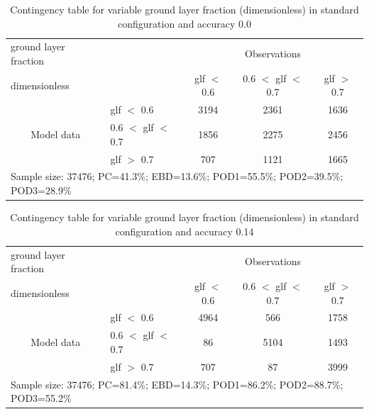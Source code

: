\documentclass[a4paper,english]{article}
\begin{document}
\newpage

\clearpage
\begin{table}[]
\begin{center}
\begin{tabular}{llccc}
\hline
{ground layer fraction}                                       &                                                    & \multicolumn{3}{c}{Observations}                 \\
{dimensionless}                                       &                             & glf $<$ 0.6   & 0.6 $<$ glf $<$ 0.7 & glf $>$ 0.7 \\
\hline
\multicolumn{1}{c}{\multirow{3}{*}{Model data}}  & glf $<$ 0.6             & 3194                & 2361                       & 1636              \\
                                                 & 0.6  $<$ glf $<$ 0.7 & 1856                & 2275                       & 2456              \\
                                                 & glf $>$ 0.7             & 707                & 1121                       & 1665              \\
\hline
\multicolumn{5}{l}{Sample size: 37476; PC=41.3\%; EBD=13.6\%; POD1=55.5\%; POD2=39.5\%; POD3=28.9\%}
\end{tabular}
\end{center}
\caption{Contingency table for variable ground layer fraction (dimensionless) in standard configuration and accuracy 0.0}
\label{tab:contingencyglfBEF}
\end{table}
\begin{table}[]
\begin{center}
\begin{tabular}{llccc}
\hline
{ground layer fraction}                                       &                                                    & \multicolumn{3}{c}{Observations}                 \\
{dimensionless}                                       &                             & glf $<$ 0.6   & 0.6 $<$ glf $<$ 0.7 & glf $>$ 0.7 \\
\hline
\multicolumn{1}{c}{\multirow{3}{*}{Model data}}  & glf $<$ 0.6             & 4964                & 566                       & 1758              \\
                                                 & 0.6  $<$ glf $<$ 0.7 & 86                & 5104                       & 1493              \\
                                                 & glf $>$ 0.7             & 707                & 87                       & 3999              \\
\hline
\multicolumn{5}{l}{Sample size: 37476; PC=81.4\%; EBD=14.3\%; POD1=86.2\%; POD2=88.7\%; POD3=55.2\%}
\end{tabular}
\end{center}
\caption{Contingency table for variable ground layer fraction (dimensionless) in standard configuration and accuracy 0.14}
\label{tab:contingencyglfBEF}
\end{table}
\end{document}
